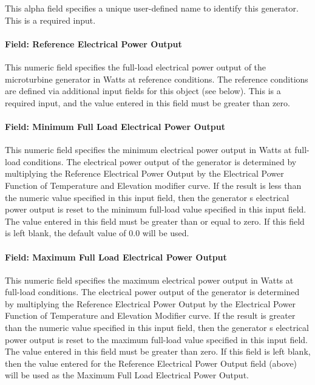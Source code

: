 This alpha field specifies a unique user-defined name to identify this generator. This is a required input.

\paragraph{Field: Reference Electrical Power Output}\label{field-reference-electrical-power-output}

This numeric field specifies the full-load electrical power output of the microturbine generator in Watts at reference conditions. The reference conditions are defined via additional input fields for this object (see below). This is a required input, and the value entered in this field must be greater than zero.

\paragraph{Field: Minimum Full Load Electrical Power Output}\label{field-minimum-full-load-electrical-power-output}

This numeric field specifies the minimum electrical power output in Watts at full-load conditions. The electrical power output of the generator is determined by multiplying the Reference Electrical Power Output by the Electrical Power Function of Temperature and Elevation modifier curve. If the result is less than the numeric value specified in this input field, then the generator s electrical power output is reset to the minimum full-load value specified in this input field. The value entered in this field must be greater than or equal to zero. If this field is left blank, the default value of 0.0 will be used.

\paragraph{Field: Maximum Full Load Electrical Power Output}\label{field-maximum-full-load-electrical-power-output}

This numeric field specifies the maximum electrical power output in Watts at full-load conditions. The electrical power output of the generator is determined by multiplying the Reference Electrical Power Output by the Electrical Power Function of Temperature and Elevation Modifier curve. If the result is greater than the numeric value specified in this input field, then the generator s electrical power output is reset to the maximum full-load value specified in this input field. The value entered in this field must be greater than zero. If this field is left blank, then the value entered for the Reference Electrical Power Output field (above) will be used as the Maximum Full Load Electrical Power Output.

